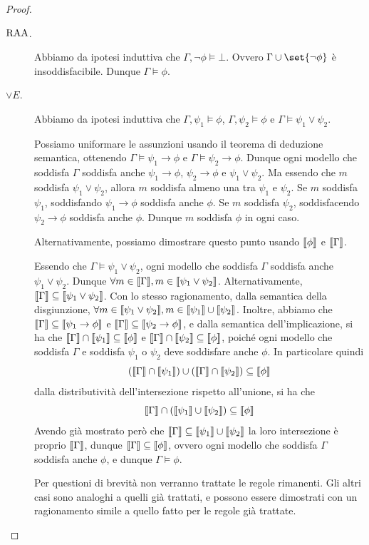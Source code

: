 \begin{proof}
\begin{description}
    \item[\(\operatorname{RAA}\).] Abbiamo da ipotesi induttiva che \(\Gamma,\neg\phi\models\bot\). Ovvero \(\Gamma\cup\set{\neg\phi}\) è insoddisfacibile. Dunque \(\Gamma\models\phi\).
    \item[\(\lor E\).] Abbiamo da ipotesi induttiva che \(\Gamma,\psi_1\models\phi\), \(\Gamma,\psi_2\models\phi\) e \(\Gamma\models\psi_1\lor\psi_2\).
    
    Possiamo uniformare le assunzioni usando il teorema di deduzione semantica, ottenendo \(\Gamma\models\psi_1\to\phi\) e \(\Gamma\models\psi_2\to\phi\). Dunque ogni modello che soddisfa \(\Gamma\) soddisfa anche \(\psi_1\to\phi\), \(\psi_2\to\phi\) e \(\psi_1\lor\psi_2\). Ma essendo che \(m\) soddisfa \(\psi_1\lor\psi_2\), allora \(m\) soddisfa almeno una tra \(\psi_1\) e \(\psi_2\). Se \(m\) soddisfa \(\psi_1\), soddisfando \(\psi_1\to\phi\) soddisfa anche \(\phi\). Se \(m\) soddisfa \(\psi_2\), soddisfacendo \(\psi_2\to\phi\) soddisfa anche \(\phi\). Dunque \(m\) soddisfa \(\phi\) in ogni caso.
    
    Alternativamente, possiamo dimostrare questo punto usando \(\den{\phi}\) e \(\den{\Gamma}\).

    Essendo che \(\Gamma\models \psi_1 \lor \psi_2\), ogni modello che soddisfa \(\Gamma\) soddisfa anche \(\psi_1\lor\psi_2\). Dunque \(\forall m \in \den{\Gamma}, m \in \den{\psi_1\lor\psi_2}\). Alternativamente, \(\den{\Gamma}\subseteq \den{\psi_1\lor\psi_2}\). Con lo stesso ragionamento, dalla semantica della disgiunzione, \(\forall m \in \den{\psi_1\lor\psi_2}, m \in \den{\psi_1}\cup \den{\psi_2}\). Inoltre, abbiamo che \(\den{\Gamma}\subseteq\den{\psi_1\to\phi}\) e \(\den{\Gamma}\subseteq\den{\psi_2\to\phi}\), e dalla semantica dell'implicazione, si ha che \(\den{\Gamma} \cap \den{\psi_1}\subseteq\den{\phi}\) e \(\den{\Gamma}\cap\den{\psi_2}\subseteq\den{\phi}\), poiché ogni modello che soddisfa \(\Gamma\) e soddisfa \(\psi_1\) o \(\psi_2\) deve soddisfare anche \(\phi\). In particolare quindi
    \[(\den{\Gamma}\cap\den{\psi_1})\cup(\den{\Gamma}\cap\den{\psi_2})\subseteq \den{\phi}\]
    dalla distributività dell'intersezione rispetto all'unione, si ha che
    \[\den{\Gamma} \cap (\den{\psi_1}\cup\den{\psi_2})\subseteq\den{\phi}\]
    Avendo già mostrato però che \(\den{\Gamma} \subseteq \den{\psi_1}\cup\den{\psi_2}\) la loro intersezione è proprio \(\den{\Gamma}\),
    dunque \(\den{\Gamma}\subseteq \den{\phi}\), ovvero ogni modello che soddisfa \(\Gamma\) soddisfa anche \(\phi\), e dunque \(\Gamma\models\phi\).
    \item[] Per questioni di brevità non verranno trattate le regole rimanenti. Gli altri casi sono analoghi a quelli già trattati, e possono essere dimostrati con un ragionamento simile a quello fatto per le regole già trattate.
  \end{description}
\end{proof}

